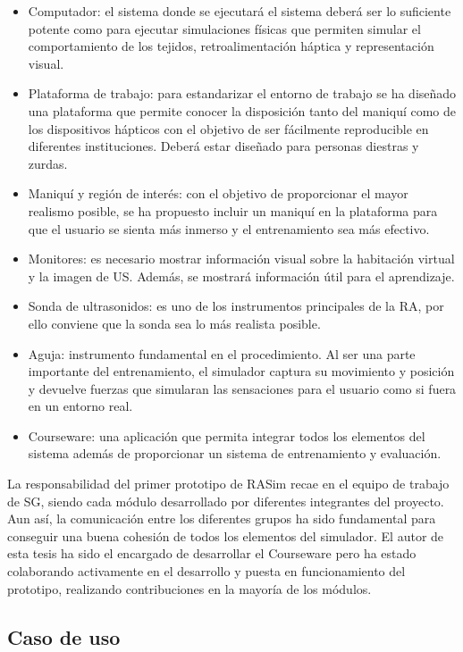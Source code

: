 \begin{itemize}
    \item Computador: el sistema donde se ejecutará el sistema deberá ser lo suficiente potente como para ejecutar simulaciones físicas que permiten simular el comportamiento de los tejidos, retroalimentación háptica y representación visual.
    \item Plataforma de trabajo: para estandarizar el entorno de trabajo se ha diseñado una plataforma que permite conocer la disposición tanto del maniquí como de los dispositivos hápticos con el objetivo de ser fácilmente reproducible en diferentes instituciones. Deberá estar diseñado para personas diestras y zurdas.
    \item Maniquí y región de interés: con el objetivo de proporcionar el mayor realismo posible, se ha propuesto incluir un maniquí en la plataforma para que el usuario se sienta más inmerso y el entrenamiento sea más efectivo.
    \item Monitores: es necesario mostrar información visual sobre la habitación virtual y la imagen de \ac{US}. Además, se mostrará información útil para el aprendizaje.
    \item Sonda de ultrasonidos: es uno de los instrumentos principales de la \ac{RA}, por ello conviene que la sonda sea lo más realista posible.
    \item Aguja: instrumento fundamental en el procedimiento. Al ser una parte importante del entrenamiento, el simulador captura su movimiento y posición y devuelve fuerzas que simularan las sensaciones para el usuario como si fuera en un entorno real.
    \item \ac{Courseware}: una aplicación que permita integrar todos los elementos del sistema además de proporcionar un sistema de entrenamiento y evaluación.
\end{itemize}

La responsabilidad del primer prototipo de \ac{RASim} recae en el equipo de trabajo de \ac{SG}, siendo cada módulo desarrollado por diferentes integrantes del proyecto. Aun así, la comunicación entre los diferentes grupos ha sido fundamental para conseguir una buena cohesión de todos los elementos del simulador. El autor de esta tesis ha sido el encargado de desarrollar el \ac{Courseware} pero ha estado colaborando activamente en el desarrollo y puesta en funcionamiento del prototipo, realizando contribuciones en la mayoría de los módulos.


\subsection{Caso de uso}
\label{rasim:casodeusorasim}


